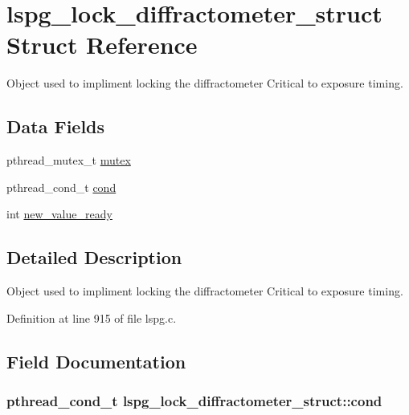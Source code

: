 \hypertarget{structlspg__lock__diffractometer__struct}{\section{lspg\-\_\-lock\-\_\-diffractometer\-\_\-struct Struct Reference}
\label{structlspg__lock__diffractometer__struct}
}


Object used to impliment locking the diffractometer Critical to exposure timing.  


\subsection*{Data Fields}
\begin{DoxyCompactItemize}
\item 
pthread\-\_\-mutex\-\_\-t \hyperlink{structlspg__lock__diffractometer__struct_a362e848dfd1551428b8d12d8776fd2ed}{mutex}
\item 
pthread\-\_\-cond\-\_\-t \hyperlink{structlspg__lock__diffractometer__struct_a7614c802af37c1d3358479a2c13ac898}{cond}
\item 
int \hyperlink{structlspg__lock__diffractometer__struct_ae94acdf44008ce48930e3083f08f5b6c}{new\-\_\-value\-\_\-ready}
\end{DoxyCompactItemize}


\subsection{Detailed Description}
Object used to impliment locking the diffractometer Critical to exposure timing. 

Definition at line 915 of file lspg.\-c.



\subsection{Field Documentation}
\hypertarget{structlspg__lock__diffractometer__struct_a7614c802af37c1d3358479a2c13ac898}{
\subsubsection[{cond}]{\setlength{\rightskip}{0pt plus 5cm}pthread\-\_\-cond\-\_\-t lspg\-\_\-lock\-\_\-diffractometer\-\_\-struct\-::cond}}\label{structlspg__lock__diffractometer__struct_a7614c802af37c1d3358479a2c13ac898}


